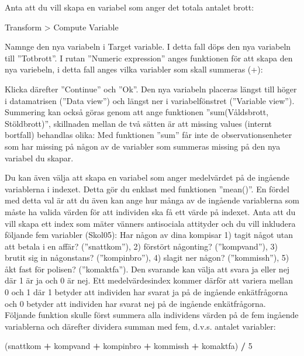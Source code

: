 \documentclass[
]{book}
\newenvironment{Shaded}{\begin{snugshade}}{\end{snugshade}}
\newcommand{\DecValTok}[1]{\textcolor[rgb]{0.00,0.00,0.81}{#1}}
\newcommand{\NormalTok}[1]{#1}
\newcommand{\SpecialCharTok}[1]{\textcolor[rgb]{0.81,0.36,0.00}{\textbf{#1}}}
\begin{document}
Anta att du vill skapa en variabel som anger det totala antalet brott:

Transform \textgreater{} Compute Variable

Namnge den nya variabeln i Target variable. I detta fall döps den nya variabeln till ''Totbrott''. I rutan
''Numeric expression'' anges funktionen för att skapa den nya variebeln, i detta fall anges vilka variabler
som skall summeras (+):

Klicka därefter ''Continue'' och ''Ok''. Den nya variabeln placeras längst till höger i datamatrisen (''Data
view'') och längst ner i variabelfönstret (''Variable view'').
Summering kan också göras genom att ange funktionen ''sum(Våldsbrott, Stöldbrott)'', skillnaden
mellan de två sätten är att missing values (internt bortfall) behandlas olika: Med funktionen ''sum'' får
inte de observationsenheter som har missing på någon av de variabler som summeras missing på den
nya variabel du skapar.

Du kan även välja att skapa en variabel som anger medelvärdet på de ingående variablerna i indexet.
Detta gör du enklast med funktionen ''mean()''. En fördel med detta val är att du även kan ange hur
många av de ingående variablerna som måste ha valida värden för att individen ska få ett värde på
indexet. Anta att du vill skapa ett index som mäter vänners antisociala attityder och du vill inkludera
följande fem variabler (Skol05): Har någon av dina kompisar 1) tagit något utan att betala i en affär?
(''snattkom''), 2) förstört någonting? (''kompvand''), 3) brutit sig in någonstans? (''kompinbro''), 4) slagit
ner någon? (''kommissh''), 5) åkt fast för polisen? (''komaktfa''). Den svarande kan välja att svara ja eller
nej där 1 är ja och 0 är nej. Ett medelvärdesindex kommer därför att variera mellan 0 och 1 där 1
betyder att individen har svarat ja på de ingående enkätfrågorna och 0 betyder att individen har svarat
nej på de ingående enkätfrågorna. Följande funktion skulle först summera alla individens värden på de
fem ingående variablerna och därefter dividera summan med fem, d.v.s. antalet variabler:

\begin{Shaded}
\begin{Highlighting}[]
\NormalTok{(snattkom }\SpecialCharTok{+}\NormalTok{ kompvand }\SpecialCharTok{+}\NormalTok{ kompinbro }\SpecialCharTok{+}\NormalTok{ kommissh }\SpecialCharTok{+}\NormalTok{ komaktfa) }\SpecialCharTok{/} \DecValTok{5}
\end{Highlighting}
\end{Shaded}
\end{document}
